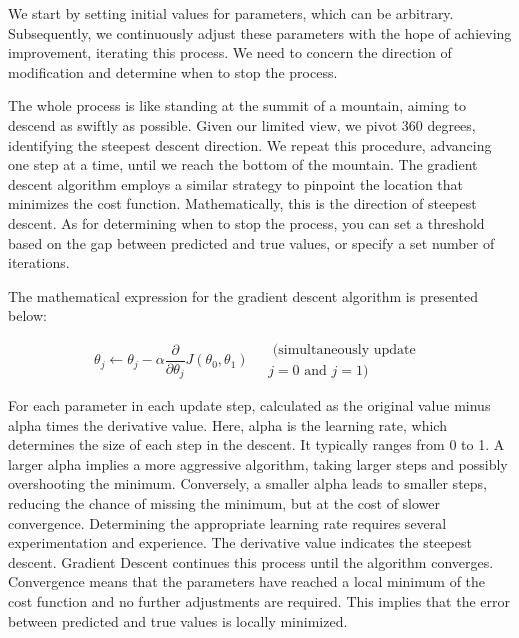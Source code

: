 \documentclass{article}
\begin{document}
     We start by setting initial values for parameters, which can be arbitrary. Subsequently, we continuously adjust these parameters with the hope of achieving improvement, iterating this process. We need to concern the direction of modification and determine when to stop the process.

     The whole process is like standing at the summit of a mountain, aiming to descend as swiftly as possible. Given our limited view, we pivot 360 degrees, identifying the steepest descent direction. We repeat this procedure, advancing one step at a time, until we reach the bottom of the mountain. The gradient descent algorithm employs a similar strategy to pinpoint the location that minimizes the cost function. Mathematically, this is the direction of steepest descent. As for determining when to stop the process, you can set a threshold based on the gap between predicted and true values, or specify a set number of iterations.

     The mathematical expression for the gradient descent algorithm is presented below:

    \hspace*{\fill}
    \begin{equation}
    \theta_j \leftarrow \theta_j-\alpha \frac{\partial}{\partial \theta_j} J\left(\theta_0, \theta_1\right) \quad \begin{gathered}\text { (simultaneously update } \\ j=0 \text { and } j=1)\end{gathered}
    \end{equation}

    \hspace*{\fill}

    For each parameter in each update step, calculated as the original value minus alpha times the derivative value. Here, alpha is the learning rate, which determines the size of each step in the descent. It typically ranges from 0 to 1. A larger alpha implies a more aggressive algorithm, taking larger steps and possibly overshooting the minimum. Conversely, a smaller alpha leads to smaller steps, reducing the chance of missing the minimum, but at the cost of slower convergence. Determining the appropriate learning rate requires several experimentation and experience. The derivative value indicates the steepest descent. Gradient Descent continues this process until the algorithm converges. Convergence means that the parameters have reached a local minimum of the cost function and no further adjustments are required. This implies that the error between predicted and true values is locally minimized.
\end{document}
